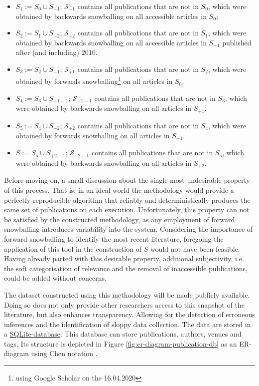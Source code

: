 \documentclass[11pt,a4paper]{book}
\theoremstyle{definition}
\theoremstyle{definition}
\theoremstyle{definition}
\theoremstyle{remark}
\newcommand{\tpsetb}{\mathcal{S}_{\mathit{-1}}}
\newcommand{\tpsetbb}{\mathcal{S}_{\mathit{-2}}}
\newcommand{\tpsetf}{\mathcal{S}_{\mathit{+1}}}
\newcommand{\tpsetff}{\mathcal{S}_{\mathit{+2}}}
\newcommand{\tpsetfb}{\mathcal{S}_{\mathit{+1-1}}}
\newcommand{\tpsetffb}{\mathcal{S}_{\mathit{+2-1}}}
\newcommand{\pset}{S}
\newcommand{\psetz}{S_{\mathit{0}}}
\newcommand{\psetb}{S_{\mathit{-1}}}
\newcommand{\psetbb}{S_{\mathit{-2}}}
\newcommand{\psetf}{S_{\mathit{+1}}}
\newcommand{\psetff}{S_{\mathit{+2}}}
\newcommand{\psetfb}{S_{\mathit{+1-1}}}
\newcommand{\psetffb}{S_{\mathit{+2-1}}}
\begin{document}
\begin{itemize}
\item $\pset_1:= \psetz \cup \psetb$; $\tpsetb$ contains all publications that are not in $\psetz$, which were obtained by backwards snowballing on all accessible articles in $\psetz$; 
\item $\pset_2:= \pset_1 \cup \psetbb$; $\tpsetbb$ contains all publications that are not in $\pset_1$, which were obtained by backwards snowballing on all accessible articles in $\psetb$ published after (and including) $2010$.
\item $\pset_3:= \pset_2 \cup \psetf$; $\tpsetf$ contains all publications that are not in $\pset_2$, which were obtained by forwards snowballing\footnote{using Google Scholar on the 16.04.2020} on all articles in $\psetz$.
\item $\pset_4:= \pset_3 \cup \psetfb$; $\tpsetfb$ contains all publications that are not in $\pset_3$, which were obtained by backwards snowballing on all articles in $\psetf$.
\item $\pset_5:= \pset_4 \cup \psetff$; $\tpsetff$ contains all publications that are not in $\pset_4$, which were obtained by forwards snowballing on all articles in $\psetf$.
\item $\pset:= \pset_5 \cup \psetffb$; $\tpsetffb$ contains all publications that are not in $\pset_5$, which were obtained by backwards snowballing on all articles in $\psetff$.
\end{itemize}


Before moving on, a small discussion about the single most undesirable property of this process. That is, in an ideal world the methodology would provide a perfectly reproducible algorithm that reliably and deterministically produces the same set of publications on each execution.
Unfortunately, this property can not be satisfied by the constructed methodology, as any employment of forward snowballing introduces variability into the system. Considering the importance of forward snowballing to identify the most recent literature, foregoing the application of this tool in the construction of $\pset$ would not have been feasible. Having already parted with this desirable property, additional subjectivity, i.e. the soft categorisation of relevance and the removal of inaccessible publications, could be added without concerns.


The dataset constructed using this methodology will be made publicly available. Doing so does not only provide other researchers access to this snapshot of the literature, but also enhances transparency. Allowing for the detection of erroneous inferences and the identification of sloppy data collection. The data are stored in a \href{https://www.sqlite.org/index.html}{SQLite-database}. This database can store publications, authors, venues and tags. Its structure is depicted in Figure \ref{fig:er-diagram-publication-db} as an ER-diagram using Chen notation \parencite{chen1976entity}.
\end{document}
